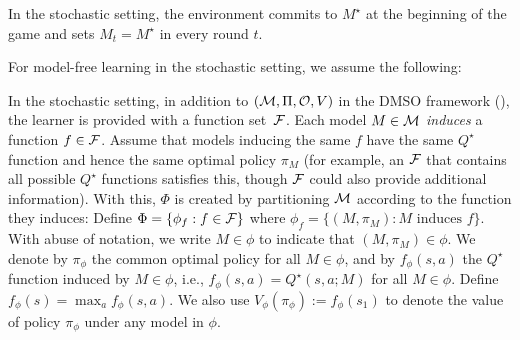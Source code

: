 \begin{definition}\label{def: stochastic sett}
    In the stochastic setting, the environment commits to $M^\star$ at the beginning of the game and sets $M_t=M^\star$ in every round $t$. 
\end{definition}
For model-free learning in the stochastic setting, we assume the following: 
\begin{assumption}\label{assum: function approximation stochastic}
In the stochastic setting, in addition to $(\mathcal{M},\Pi, \mathcal{O}, V)$ in the DMSO framework (), the learner is provided with a function set~$\mathcal{F}$. Each model $M\in \mathcal{M}$ \emph{induces} a function $f\in\mathcal{F}$. Assume that models inducing the same $f$ have the same $Q^\star$ function and hence the same optimal policy $\pi_M$ (for example, an $\mathcal{F}$ that contains all possible $Q^\star$ functions satisfies this, though $\mathcal{F}$ could also provide additional information). With this, $\Phi$ is created by partitioning $\mathcal{M}$ according to the function they induces: Define $\Phi=\{\phi_f: f\in\mathcal{F}\}$ where $\phi_f=\{(M,\pi_M): M\text{~induces~}f\}$.  With abuse of notation, we write $M\in\phi$ to indicate that $(M, \pi_M)\in \phi$.  We denote by $\pi_\phi$ the common optimal policy for all $M\in\phi$, and by $f_\phi(s,a)$ the $Q^\star$ function induced by $M\in\phi$, i.e., $f_\phi(s,a)=Q^\star(s,a; M)$ for all $M\in\phi$. Define $f_\phi(s)=\max_{a} f_\phi(s,a)$. We also use $V_\phi(\pi_\phi):=f_\phi(s_1)$ to denote the value of policy $\pi_\phi$ under any model in $\phi$.   
\end{assumption}




